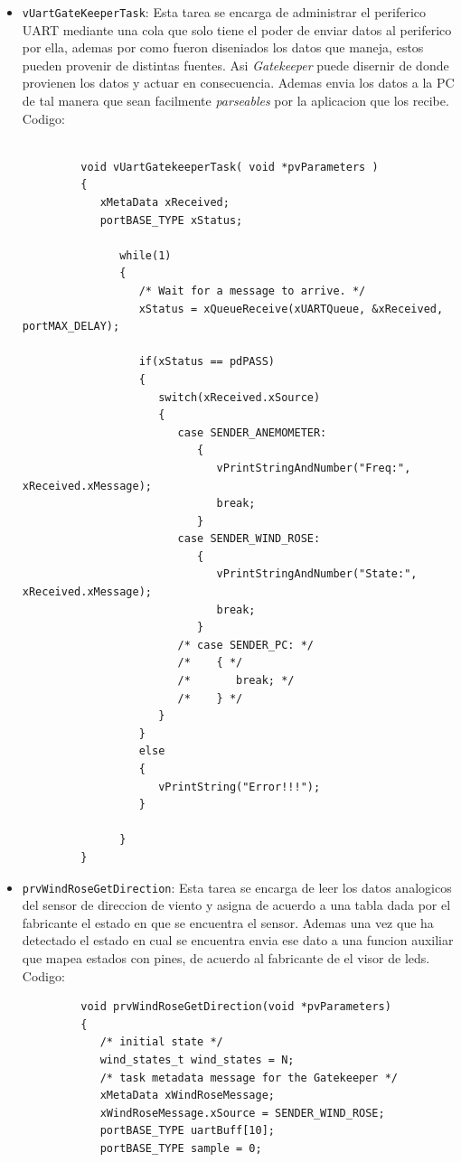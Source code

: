 \documentclass[10pt]{article}
\begin{document}
\begin{itemize}
\begin{verbatim}
         }
      \end{verbatim}
   \item \verb|vUartGateKeeperTask|: Esta tarea se encarga de administrar el periferico UART mediante una cola que solo tiene el poder de enviar datos al periferico por ella, ademas por como fueron diseniados los datos que maneja, estos pueden provenir de distintas fuentes. Asi \textit{Gatekeeper} puede disernir de donde provienen los datos y actuar en consecuencia. Ademas envia los datos a la PC de tal manera que sean facilmente \textit{parseables} por la aplicacion que los recibe. Codigo:
      \begin{verbatim}

         void vUartGatekeeperTask( void *pvParameters )
         {
            xMetaData xReceived;
            portBASE_TYPE xStatus;

               while(1)
               {
                  /* Wait for a message to arrive. */
                  xStatus = xQueueReceive(xUARTQueue, &xReceived, portMAX_DELAY);

                  if(xStatus == pdPASS)
                  {
                     switch(xReceived.xSource)
                     {
                        case SENDER_ANEMOMETER:
                           {
                              vPrintStringAndNumber("Freq:", xReceived.xMessage);
                              break;
                           }
                        case SENDER_WIND_ROSE:
                           {
                              vPrintStringAndNumber("State:", xReceived.xMessage);
                              break;
                           }
                        /* case SENDER_PC: */
                        /*    { */
                        /*       break; */
                        /*    } */
                     }
                  }
                  else
                  {
                     vPrintString("Error!!!");
                  }

               }
         }
      \end{verbatim}
   \item \verb|prvWindRoseGetDirection|: Esta tarea se encarga de leer los datos analogicos del sensor de direccion de viento y asigna de acuerdo a una tabla dada por el fabricante el estado en que se encuentra el sensor. Ademas una vez que ha detectado el estado en cual se encuentra envia ese dato a una funcion auxiliar que mapea estados con pines, de acuerdo al fabricante de el visor de leds. Codigo:
      \begin{verbatim}
         void prvWindRoseGetDirection(void *pvParameters)
         {
            /* initial state */
            wind_states_t wind_states = N;
            /* task metadata message for the Gatekeeper */
            xMetaData xWindRoseMessage;
            xWindRoseMessage.xSource = SENDER_WIND_ROSE;
            portBASE_TYPE uartBuff[10];
            portBASE_TYPE sample = 0;


\end{verbatim}
\end{itemize}
\end{document}
